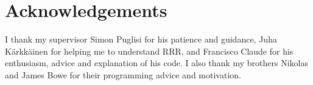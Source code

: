 \section{Acknowledgements}

I thank my supervisor Simon Puglisi for his patience and guidance,
Juha K\"{a}rkk\"{a}inen for helping me to understand RRR, and
Francisco Claude for his enthusiasm, advice and explanation of his
code. I also thank my brothers Nikolas and James Bowe for their
programming advice and motivation.
